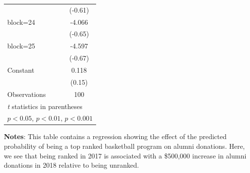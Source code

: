\documentclass{article}
\begin{document}
{\begin{longtable}{l*{1}{c}}
                    &     (-0.61)         \\
[1em]
block=24            &      -4.066         \\
                    &     (-0.65)         \\
[1em]
block=25            &      -4.597         \\
                    &     (-0.67)         \\
[1em]
Constant            &       0.118         \\
                    &      (0.15)         \\
\hline
Observations        &         100         \\
\hline\hline
\multicolumn{2}{l}{\footnotesize \textit{t} statistics in parentheses}\\
\multicolumn{2}{l}{\footnotesize \sym{*} \(p<0.05\), \sym{**} \(p<0.01\), \sym{***} \(p<0.001\)}\\
\end{longtable}
}

\textbf{Notes}: This table contains a regression showing the effect of the predicted probability of being a top ranked basketball program on alumni donations. Here, we see that being ranked in 2017 is associated with a \$500,000 increase in alumni donations in 2018 relative to being unranked.
\end{document}
